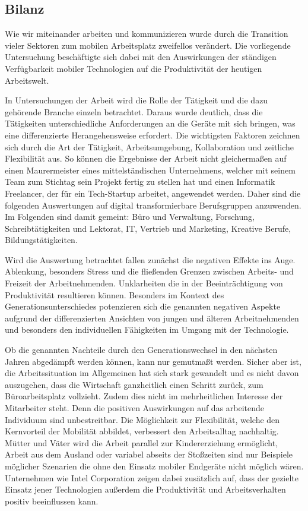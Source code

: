 \documentclass[12pt,a4paper]{article}
\begin{document}
\subsection*{Bilanz}
Wie wir miteinander arbeiten und kommunizieren wurde durch die Transition vieler Sektoren zum mobilen Arbeitsplatz zweifellos verändert. Die vorliegende Untersuchung beschäftigte sich dabei mit den Auswirkungen der ständigen Verfügbarkeit mobiler Technologien auf die Produktivität der heutigen Arbeitswelt.  

In Untersuchungen der Arbeit wird die Rolle der Tätigkeit und die dazu gehörende Branche einzeln betrachtet. Daraus wurde deutlich, dass die Tätigkeiten unterschiedliche Anforderungen an die Geräte mit sich bringen, was eine differenzierte Herangehensweise erfordert. Die wichtigsten Faktoren zeichnen sich durch die Art der Tätigkeit, Arbeitsumgebung, Kollaboration und zeitliche Flexibilität aus. So können die Ergebnisse der Arbeit nicht gleichermaßen auf einen Maurermeister eines mittelständischen Unternehmens, welcher mit seinem Team zum Stichtag sein Projekt fertig zu stellen hat und einen Informatik Freelancer, der für ein Tech-Startup arbeitet, angewendet werden. Daher sind die folgenden Auswertungen auf digital transformierbare Berufsgruppen anzuwenden. Im Folgenden sind damit gemeint: Büro und Verwaltung, Forschung, Schreibtätigkeiten und Lektorat, IT, Vertrieb und Marketing, Kreative Berufe, Bildungstätigkeiten. 

Wird die Auswertung betrachtet fallen zunächst die negativen Effekte ins Auge. Ablenkung, besonders Stress und die fließenden Grenzen zwischen Arbeits- und Freizeit der Arbeitnehmenden. Unklarheiten die in der Beeinträchtigung von Produktivität resultieren können. Besonders im Kontext des Generationsunterschiedes potenzieren sich die genannten negativen Aspekte aufgrund der differenzierten Ansichten von jungen und älteren Arbeitnehmenden und besonders den individuellen Fähigkeiten im Umgang mit der Technologie. 

Ob die genannten Nachteile durch den Generationswechsel in den nächsten Jahren abgedämpft werden können, kann nur gemutmaßt werden. Sicher aber ist, die Arbeitssituation im Allgemeinen hat sich stark gewandelt und es nicht davon auszugehen, dass die Wirtschaft ganzheitlich einen Schritt zurück, zum Büroarbeitsplatz vollzieht. Zudem dies nicht im mehrheitlichen Interesse der Mitarbeiter steht. Denn die positiven Auswirkungen auf das arbeitende Individuum sind unbestreitbar. Die Möglichkeit zur Flexibilität, welche den Kernvorteil der Mobilität abbildet, verbessert den Arbeitsalltag nachhaltig. Mütter und Väter wird die Arbeit parallel zur Kindererziehung ermöglicht, Arbeit aus dem Ausland oder variabel abseits der Stoßzeiten sind nur Beispiele möglicher Szenarien die ohne den Einsatz mobiler Endgeräte nicht möglich wären. Unternehmen wie Intel Corporation zeigen dabei zusätzlich auf, dass der gezielte Einsatz jener Technologien außerdem die Produktivität und Arbeitsverhalten positiv beeinflussen kann.  
\end{document}
